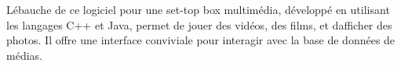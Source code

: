L\textquotesingle{}ébauche de ce logiciel pour une set-\/top box multimédia, développé en utilisant les langages C++ et Java, permet de jouer des vidéos, des films, et d\textquotesingle{}afficher des photos. Il offre une interface conviviale pour interagir avec la base de données de médias. 